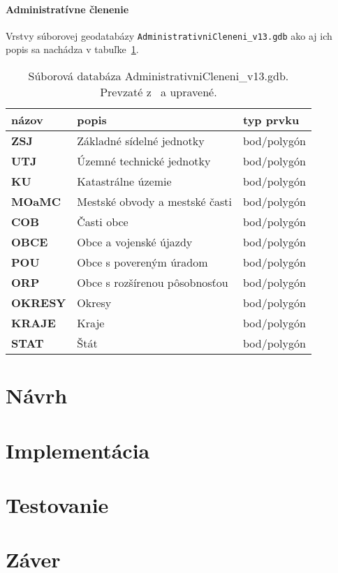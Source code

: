 \subsubsection*{Administratívne členenie}
Vrstvy súborovej geodatabázy \texttt{AdministrativniCleneni\_v13.gdb} ako aj ich popis sa nachádza v tabuľke~\ref{tab:administrativne-clenenie}.
\begin{table}[H]
    \centering
    \begin{tabular}{|lll|}
    \hline
    \textbf{názov}  & \textbf{popis}                 & \textbf{typ prvku} \\ \hline
    \textbf{ZSJ}    & Základné sídelné jednotky      & bod/polygón        \\
    \textbf{UTJ}    & Územné technické jednotky      & bod/polygón        \\
    \textbf{KU}     & Katastrálne územie             & bod/polygón        \\
    \textbf{MOaMC}  & Mestské obvody a mestské časti & bod/polygón        \\
    \textbf{COB}    & Časti obce                     & bod/polygón        \\
    \textbf{OBCE}   & Obce a vojenské újazdy         & bod/polygón        \\
    \textbf{POU}    & Obce s povereným úradom        & bod/polygón        \\
    \textbf{ORP}    & Obce s rozšírenou pôsobnosťou  & bod/polygón        \\
    \textbf{OKRESY} & Okresy                         & bod/polygón        \\
    \textbf{KRAJE}  & Kraje                          & bod/polygón        \\
    \textbf{STAT}   & Štát                           & bod/polygón        \\ \hline
    \end{tabular}
    \caption{Súborová databáza AdministrativniCleneni\_v13.gdb. Prevzaté z~\cite{arcgis} a upravené.}
    \label{tab:administrativne-clenenie}
\end{table}

\chapter{Návrh}
\label{navrh}
\blindtext[2]

\Blindtext


\chapter{Implementácia}
\label{implementacia}

\blindtext[13]


\chapter{Testovanie}
\label{testovanie}

\blindtext[1]

\blindtext[10]



\chapter{Záver}
\label{zaver}

\blindtext[3]
